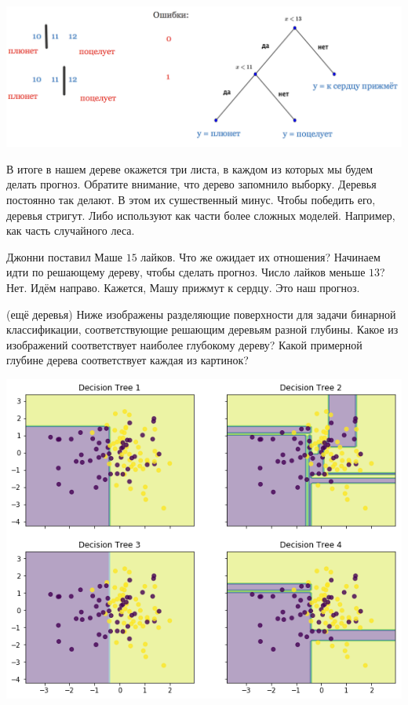 \documentclass[12pt, a4paper, oneside]{article}
\theoremstyle{plain} %
\theoremstyle{definition}
\begin{document}
\begin{solution}
\begin{center}
	\includegraphics[scale=0.28]{class_tree_2.png}
\end{center} 	

В итоге в нашем дереве окажется три листа, в каждом из которых мы будем делать прогноз. Обратите внимание, что дерево запомнило выборку.  Деревья постоянно так делают. В этом их сушественный минус. Чтобы победить его, деревья стригут. Либо используют как части более сложных моделей. Например, как часть случайного леса. 
	
Джонни поставил Маше $15$ лайков. Что же ожидает их отношения? Начинаем идти по решающему дереву, чтобы сделать прогноз. Число лайков меньше $13$? Нет. Идём направо. Кажется, Машу прижмут к сердцу. Это наш прогноз.  	
\end{solution}

\begin{problem}{(ещё деревья)}
Ниже изображены разделяющие поверхности для задачи бинарной классификации, соответствующие решающим деревьям разной глубины. Какое из изображений соответствует наиболее глубокому дереву? Какой примерной глубине дерева соответствует каждая из картинок? 

\begin{center}
	\includegraphics[scale=0.6]{trees.png}
\end{center}
\end{problem}
\end{document}
